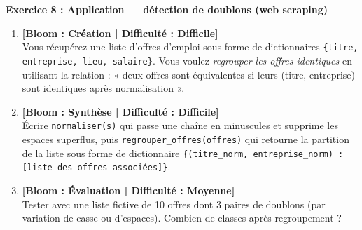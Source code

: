 \noindent\textbf{Exercice 8 : Application --- détection de doublons (web scraping)}
\begin{enumerate}
    \item \textbf{[Bloom : Création | Difficulté : Difficile]} \\
    Vous récupérez une liste d'offres d'emploi sous forme de dictionnaires \texttt{\{titre, entreprise, lieu, salaire\}}. Vous voulez \emph{regrouper les offres identiques} en utilisant la relation : « deux offres sont équivalentes si leurs (titre, entreprise) sont identiques après normalisation ».
    \item \textbf{[Bloom : Synthèse | Difficulté : Difficile]} \\
    Écrire \texttt{normaliser(s)} qui passe une chaîne en minuscules et supprime les espaces superflus, puis \texttt{regrouper\_offres(offres)} qui retourne la partition de la liste sous forme de dictionnaire \texttt{\{(titre\_norm, entreprise\_norm) : [liste des offres associées]\}}.
    \item \textbf{[Bloom : Évaluation | Difficulté : Moyenne]} \\
    Tester avec une liste fictive de 10 offres dont 3 paires de doublons (par variation de casse ou d'espaces). Combien de classes après regroupement ?
\end{enumerate}
